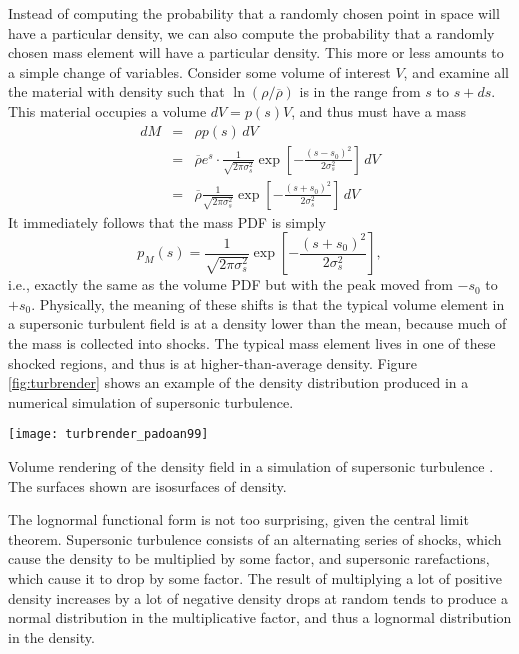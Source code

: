 Instead of computing the probability that a randomly chosen point in space will have a particular density, we can also compute the probability that a randomly chosen mass element will have a particular density. This more or less amounts to a simple change of variables. Consider some volume of interest $V$, and examine all the material with density such that $\ln(\rho/\overline{\rho})$ is in the range from $s$ to $s+ds$. This material occupies a volume $dV = p(s) V$, and thus must have a mass
\begin{eqnarray}
dM & = & \rho p(s) \, dV \\
& = & \overline{\rho} e^s \cdot \frac{1}{\sqrt{2\pi \sigma_s^2}} \exp\left[-\frac{(s-s_0)^2}{2\sigma_s^2}\right]\,  dV \\
& = & \overline{\rho} \frac{1}{\sqrt{2\pi \sigma_s^2}} \exp\left[-\frac{(s+s_0)^2}{2\sigma_s^2}\right]\,  dV
\end{eqnarray}
It immediately follows that the mass PDF is simply
\begin{equation}
p_M(s) = \frac{1}{\sqrt{2\pi \sigma_s^2}} \exp\left[-\frac{(s+s_0)^2}{2\sigma_s^2}\right],
\end{equation}
i.e., exactly the same as the volume PDF but with the peak moved from $-s_0$ to $+s_0$. Physically, the meaning of these shifts is that the typical volume element in a supersonic turbulent field is at a density lower than the mean, because much of the mass is collected into shocks. The typical mass element lives in one of these shocked regions, and thus is at higher-than-average density. Figure \ref{fig:turbrender} shows an example of the density distribution produced in a numerical simulation of supersonic turbulence.
\begin{marginfigure}
\texttt{[image: turbrender\_padoan99]}
\caption[Volume rendering of the density field for supersonic turbulence]{
\label{fig:turbrender}
Volume rendering of the density field in a simulation of supersonic turbulence \citep{padoan99a}. The surfaces shown are isosurfaces of density.
}
\end{marginfigure}

The lognormal functional form is not too surprising, given the central limit theorem. Supersonic turbulence consists of an alternating series of shocks, which cause the density to be multiplied by some factor, and supersonic rarefactions, which cause it to drop by some factor. The result of multiplying a lot of positive density increases by a lot of negative density drops at random tends to produce a normal distribution in the multiplicative factor, and thus a lognormal distribution in the density.

